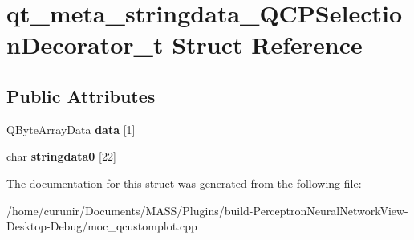 \hypertarget{structqt__meta__stringdata___q_c_p_selection_decorator__t}{}\section{qt\+\_\+meta\+\_\+stringdata\+\_\+\+Q\+C\+P\+Selection\+Decorator\+\_\+t Struct Reference}
\label{structqt__meta__stringdata___q_c_p_selection_decorator__t}
\subsection*{Public Attributes}
\begin{DoxyCompactItemize}
\item 
Q\+Byte\+Array\+Data {\bfseries data} \mbox{[}1\mbox{]}\hypertarget{structqt__meta__stringdata___q_c_p_selection_decorator__t_a1afefbcc9caf562bf85a48bef4fdd12a}{}\label{structqt__meta__stringdata___q_c_p_selection_decorator__t_a1afefbcc9caf562bf85a48bef4fdd12a}

\item 
char {\bfseries stringdata0} \mbox{[}22\mbox{]}\hypertarget{structqt__meta__stringdata___q_c_p_selection_decorator__t_a396f24ff22a1439774cf0634b5080197}{}\label{structqt__meta__stringdata___q_c_p_selection_decorator__t_a396f24ff22a1439774cf0634b5080197}

\end{DoxyCompactItemize}


The documentation for this struct was generated from the following file\+:\begin{DoxyCompactItemize}
\item 
/home/curunir/\+Documents/\+M\+A\+S\+S/\+Plugins/build-\/\+Perceptron\+Neural\+Network\+View-\/\+Desktop-\/\+Debug/moc\+\_\+qcustomplot.\+cpp\end{DoxyCompactItemize}
